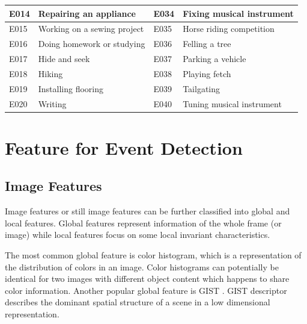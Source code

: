 \begin{table}
\begin{tabular}{@{}|c|l|l|l|@{}}
		\multicolumn{1}{|l|}{E014} & Repairing an appliance                   & E034        & Fixing musical instrument         \\ \midrule
		\multicolumn{1}{|l|}{E015} & Working on a sewing project              & E035        & Horse riding competition          \\ \midrule
		\multicolumn{1}{|l|}{E016} & Doing homework or studying               & E036        & Felling a tree                    \\ \midrule
		\multicolumn{1}{|l|}{E017} & Hide and seek                            & E037        & Parking a vehicle                 \\ \midrule
		\multicolumn{1}{|l|}{E018} & Hiking                                   & E038        & Playing fetch                     \\ \midrule
		\multicolumn{1}{|l|}{E019} & Installing flooring                      & E039        & Tailgating                        \\ \midrule
		\multicolumn{1}{|l|}{E020} & Writing                                  & E040        & Tuning musical instrument         \\ \bottomrule
	\end{tabular}
	\label{c2_eventlist}
\end{table}

\section{Feature for Event Detection}
\label{c2_sec_med_feature}
\subsection{Image Features}

Image features or still image features can be further classified into global and local features. Global features represent information of the whole frame (or image) while local features focus on some local invariant characteristics.

The most common global feature is color histogram, which is a representation of the distribution of colors in an image. Color histograms can potentially be identical for two images with different object content which happens to share color information. Another popular global feature is GIST \cite{oliva2001modeling}. GIST descriptor describes the dominant spatial structure of a scene in a low dimensional representation.

